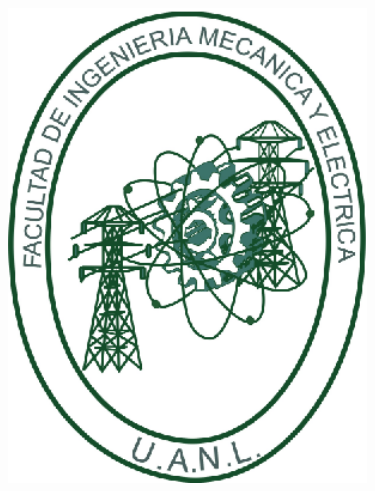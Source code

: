 \documentclass[a0,portrait]{a0poster}
\begin{document}
\begin{minipage}[b]{0.20\linewidth}
    \begin{center}
        \includegraphics[width=9.5cm]{fime.eps}\\
        \vspace{5cm}    
    \end{center}
\end{minipage}

\vspace{1cm}
\end{document}
